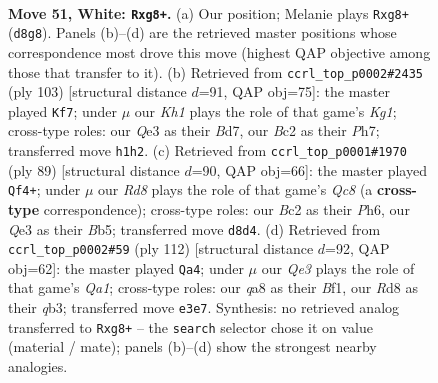 \documentclass[11pt]{article}
\begin{document}
\clearpage

\begin{figure}[p]\centering
\begin{subfigure}{0.46\textwidth}\centering
\resizebox{\linewidth}{!}{%
\newchessgame
\chessboard[
  setfen={qrbR2nk/p1p2pp1/1p6/7p/1P3P1b/B3Q2P/P1B3P1/7K w - - 9 51},
  showmover=false,
  pgfstyle=straightmove, color=movearrow, markmove={d8-g8}
]}
\caption{}
\end{subfigure}\hfill
\begin{subfigure}{0.46\textwidth}\centering
\resizebox{\linewidth}{!}{%
\newchessgame
\chessboard[
  setfen={6k1/3b3p/1p1q4/pP1P1p2/P5pP/6P1/1rBQ1R1K/8 b - - 5 52},
  showmover=false,
  pgfstyle=straightmove, color=movearrow, markmove={g8-f7}
]}
\caption{}
\end{subfigure}
\\[4pt]
\begin{subfigure}{0.46\textwidth}\centering
\resizebox{\linewidth}{!}{%
\newchessgame
\chessboard[
  setfen={5k2/2R2pp1/p3p2p/1b2P2P/pP1r4/P4P2/2B2QPK/2q5 b - - 2 45},
  showmover=false,
  pgfstyle=straightmove, color=movearrow, markmove={c1-f4}
]}
\caption{}
\end{subfigure}\hfill
\begin{subfigure}{0.46\textwidth}\centering
\resizebox{\linewidth}{!}{%
\newchessgame
\chessboard[
  setfen={Rb2r1k1/1b4pp/4p3/2pn1p2/2N2P2/1q1P2PP/5B2/Q4BK1 w - - 17 57},
  showmover=false,
  pgfstyle=straightmove, color=movearrow, markmove={a1-a4}
]}
\caption{}
\end{subfigure}
\caption{\textbf{Move 51, White: \texttt{Rxg8+}.} (a) Our position; Melanie plays \texttt{Rxg8+} (\texttt{d8g8}). Panels (b)--(d) are the retrieved master positions whose correspondence most drove this move (highest QAP objective among those that transfer to it). (b) Retrieved from \texttt{ccrl\_top\_p0002\#2435} (ply 103) [structural distance $d$=91, QAP obj=75]: the master played \texttt{Kf7}; under $\mu$ our \emph{Kh1} plays the role of that game's \emph{Kg1}; cross-type roles: our \emph{Q}e3 as their \emph{B}d7, our \emph{B}c2 as their \emph{P}h7; transferred move \texttt{h1h2}. (c) Retrieved from \texttt{ccrl\_top\_p0001\#1970} (ply 89) [structural distance $d$=90, QAP obj=66]: the master played \texttt{Qf4+}; under $\mu$ our \emph{Rd8} plays the role of that game's \emph{Qc8} (a \textbf{cross-type} correspondence); cross-type roles: our \emph{B}c2 as their \emph{P}h6, our \emph{Q}e3 as their \emph{B}b5; transferred move \texttt{d8d4}. (d) Retrieved from \texttt{ccrl\_top\_p0002\#59} (ply 112) [structural distance $d$=92, QAP obj=62]: the master played \texttt{Qa4}; under $\mu$ our \emph{Qe3} plays the role of that game's \emph{Qa1}; cross-type roles: our \emph{q}a8 as their \emph{B}f1, our \emph{R}d8 as their \emph{q}b3; transferred move \texttt{e3e7}. Synthesis: no retrieved analog transferred to \texttt{Rxg8+} -- the \texttt{search} selector chose it on value (material / mate); panels (b)--(d) show the strongest nearby analogies.}
\label{fig:thought-m100}
\end{figure}
\end{document}
